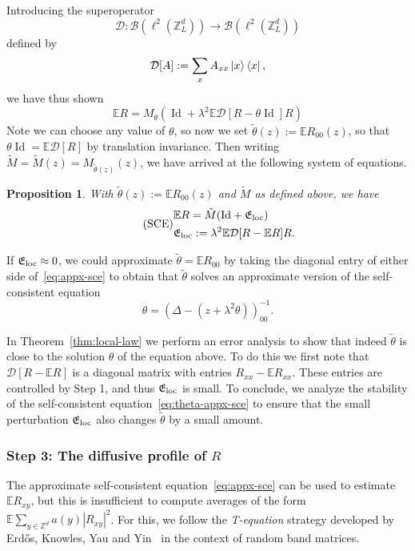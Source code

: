 \documentclass[11pt]{amsart}
\def\Z{{\mathbb{Z}}}
\def\Expec{{\mathbb E}}
\newcommand{\Id}{{\operatorname*{Id}}}
\def\bra#1{\mathinner{\langle{#1}|}}
\def\ket#1{\mathinner{|{#1}\rangle}}
\newcommand{\mcal}[1]{{\mathcal{#1}}}
\numberwithin{equation}{section}
\numberwithin{theorem}{section}
\newtheorem{proposition}[theorem]{Proposition}
\begin{document}
Introducing the superoperator
\[
\mathcal{D}:\mathcal{B}(\ell^2(\mathbb{Z}^d_L))\to \mathcal{B}(\ell^2(\mathbb{Z}^d_L))
\]
defined by
\begin{equation}
\label{eq:D-def}
\mathcal{D}[A] := \sum_{x}A_{xx}\ket{x}\bra{x},
\end{equation}
we have thus shown
\begin{equation}
\label{eq:sce-first-draft}
\mathbb{E}R = M_\theta(\Id+\lambda^2\mathbb{E}\mathcal{D}[R-\theta \Id]R )
\end{equation}
Note we can choose any value of $\theta$, so now we set $\tilde{\theta}(z) := \Expec R_{00}(z)$, so that $\theta\Id=\Expec \mcal{D}[R]$ by translation invariance.  Then writing
$\tilde{M} = \tilde{M}(z) = M_{\tilde{\theta}(z)}(z)$, we have arrived at the following system of equations.
\begin{proposition}
\label{prp:approxSCE}
With $\tilde{\theta}(z) := \Expec R_{00}(z)$ and $\tilde{M}$ as defined above, we have
\begin{equation}\tag*{(SCE)}
\label{eq:appx-sce}
\begin{split}
&\mathbb{E}R = \tilde{M}(\Id+\mathfrak{E}_{\rm loc}) \\
&\mathfrak{E}_{\rm loc} := \lambda^2\mathbb{E}\mathcal{D}[R-\Expec R]R.
\end{split}
\end{equation}
\end{proposition}
If $\mathfrak{E}_{\rm loc} \approx 0$, we could approximate $\tilde{\theta} = \Expec R_{00}$ by taking the diagonal entry of either
side of~\ref{eq:appx-sce} to obtain that $\tilde{\theta}$ solves an approximate version of the self-consistent equation
\begin{equation}
\label{eq:theta-appx-sce}
\theta = (\Delta - (z+\lambda^2 \theta))^{-1}_{00}.
\end{equation}

In Theorem~\ref{thm:local-law} we perform an error analysis to show that indeed $\tilde{\theta}$ is close to the solution $\theta$ of the equation above.
To do this we first note  that $\mcal{D}[R-\Expec R]$ is a diagonal
matrix with entries $R_{xx}-\Expec R_{xx}$.   These entries are controlled by Step 1, and thus $\mathfrak{E}_{\rm loc}$ is small.  To conclude, we analyze the stability of the self-consistent equation~\eqref{eq:theta-appx-sce} to ensure that the small perturbation $\mathfrak{E}_{\rm loc}$ also changes $\tilde{\theta}$ by a small amount.

\subsubsection{Step 3: The diffusive profile of $R$}
\label{sec:Teqintro}
The approximate self-consistent equation~\ref{eq:appx-sce} can be used to estimate $\Expec R_{xy}$, but this is insufficient to compute averages of the form $\Expec\sum_{y\in\Z^d}a(y)|R_{xy}|^2$.
For this, we follow
the \textit{T-equation} strategy developed by Erd\H{o}s, Knowles, Yau and Yin~\cite{Y3Teq} in the context of random band matrices.
\end{document}
